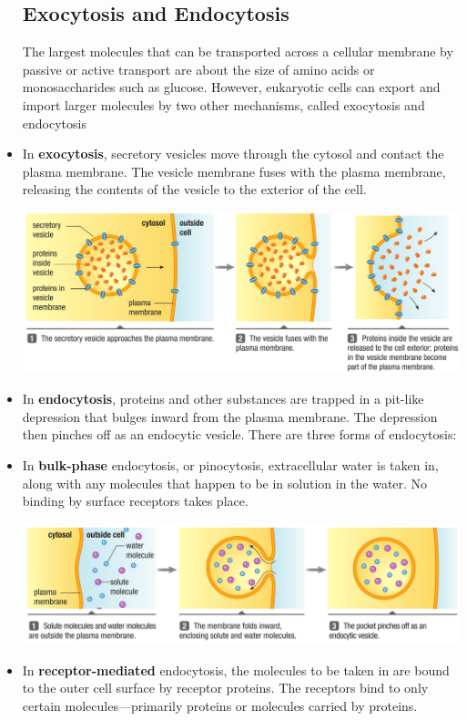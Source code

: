 \documentclass[letterpaper]{article}
\numberwithin{equation}{section}
\theoremstyle{classic}
\begin{document}
\begin{itemize}
\subsection{Exocytosis and Endocytosis}
\begin{idea}
    The largest molecules that can be transported across a cellular membrane by passive or active transport are about the size of amino acids or monosaccharides such as glucose. However, eukaryotic cells can export and import larger molecules by two other mechanisms, called exocytosis and endocytosis
\end{idea}
\item In \textbf{exocytosis}, secretory vesicles move through the cytosol and contact the plasma membrane. The vesicle membrane fuses with the plasma membrane, releasing the contents of the vesicle to the exterior of the cell.
\begin{center}\includegraphics[width=0.8\linewidth]{A21.PNG}\end{center}
\item In \textbf{endocytosis}, proteins and other substances are trapped in a pit-like depression that bulges inward from the plasma membrane. The depression then pinches off as an endocytic vesicle. There are three forms of endocytosis:
\item In \textbf{bulk-phase} endocytosis, or pinocytosis, extracellular water is taken in, along with any molecules that happen to be in solution in the water. No binding by surface receptors takes place.
\begin{center}\includegraphics[width=0.8\linewidth]{A22.PNG}\end{center}
\item In \textbf{receptor-mediated} endocytosis, the molecules
to be taken in are bound to the outer cell surface by receptor proteins. The receptors bind to only certain molecules—primarily proteins or molecules carried by proteins.

\end{itemize}
\end{document}
